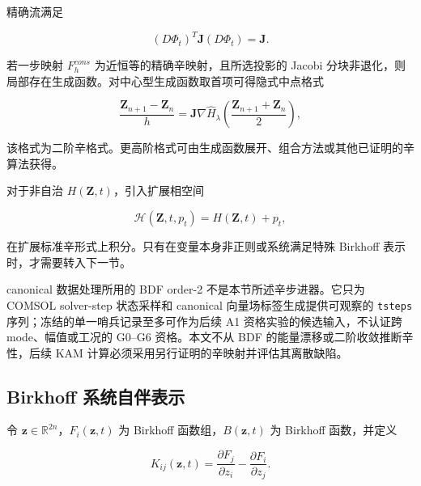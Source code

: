 精确流满足

\begin{equation}
\label{eq:symplectic-kam-5-2}
\left( D\Phi_{t} \right)^{T}\mathbf{J}\left( D\Phi_{t} \right) = \mathbf{J}.
\end{equation}

若一步映射 \(F_{h}^{cons}\) 为近恒等的精确辛映射，且所选投影的 Jacobi 分块非退化，则局部存在生成函数。对中心型生成函数取首项可得隐式中点格式

\begin{equation}
\label{eq:symplectic-kam-5-3}
\frac{\mathbf{Z}_{n + 1} - \mathbf{Z}_{n}}{h} = \mathbf{J}\nabla{\widehat{H}}_{\lambda}\left( \frac{\mathbf{Z}_{n + 1} + \mathbf{Z}_{n}}{2} \right),
\end{equation}

该格式为二阶辛格式。更高阶格式可由生成函数展开、组合方法或其他已证明的辛算法获得\cite{FengQin2010}。

对于非自治 \(H\left( \mathbf{Z},t \right)\)，引入扩展相空间

\begin{equation}
\label{eq:symplectic-kam-5-4}
\mathcal{H}\left( \mathbf{Z},t,p_{t} \right) = H\left( \mathbf{Z},t \right) + p_{t},
\end{equation}

在扩展标准辛形式上积分。只有在变量本身非正则或系统满足特殊 Birkhoff 表示时，才需要转入下一节。

canonical 数据处理所用的 BDF order-2 不是本节所述辛步进器。它只为 COMSOL solver-step 状态采样和 canonical 向量场标签生成提供可观察的 \texttt{tsteps} 序列；冻结的单一哨兵记录至多可作为后续 A1 资格实验的候选输入，不认证跨 mode、幅值或工况的 G0--G6 资格。本文不从 BDF 的能量漂移或二阶收敛推断辛性，后续 KAM 计算必须采用另行证明的辛映射并评估其离散缺陷。

\subsection{Birkhoff 系统自伴表示}\label{sec:symplectic-kam-5-3}

令 \(\mathbf{z} \in \mathbb{R}^{2n}\)，\(F_{i}\left( \mathbf{z},t \right)\) 为 Birkhoff 函数组，\(B\left( \mathbf{z},t \right)\) 为 Birkhoff 函数，并定义

\begin{equation}
\label{eq:symplectic-kam-5-5}
K_{ij}\left( \mathbf{z},t \right) = \frac{\partial F_{j}}{\partial z_{i}} - \frac{\partial F_{i}}{\partial z_{j}}.
\end{equation}

